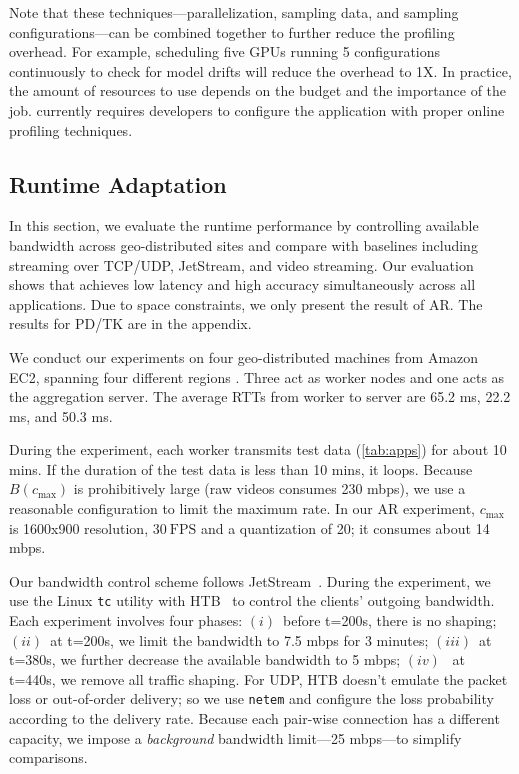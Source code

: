 Note that these techniques---parallelization, sampling data, and sampling
configurations---can be combined together to further reduce the profiling
overhead. For example, scheduling five GPUs running 5 configurations
continuously to check for model drifts will reduce the overhead to 1X\@. In
practice, the amount of resources to use depends on the budget and the
importance of the job. \sysname{} currently requires developers to configure the
application with proper online profiling techniques.


\subsection{Runtime Adaptation}
\label{sec:runtime-adaptation}

In this section, we evaluate the runtime performance by controlling available
bandwidth across geo-distributed sites and compare \sysname{} with baselines
including streaming over TCP/UDP, JetStream, and video streaming. Our evaluation
shows that \sysname{} achieves low latency and high accuracy simultaneously
across all applications. Due to space constraints, we only present the result of
AR. The results for PD/TK are in the appendix.

 We conduct our experiments on four geo-distributed
machines from Amazon EC2, spanning four different regions . Three
act as worker
nodes and one acts as the aggregation server. The average RTTs from worker to
server are 65.2 ms, 22.2 ms, and 50.3 ms.

During the experiment, each worker transmits test data (\autoref{tab:apps}) for
about 10 mins. If the duration of the test data is less than 10 mins, it
loops. Because $B(c_{\max})$ is prohibitively large (raw videos consumes 230
mbps), we use a reasonable configuration to limit the maximum rate. In our AR
experiment, $c_{\max}$ is 1600x900 resolution, \(30~\text{FPS}\) and a
quantization of 20; it consumes about 14 mbps.

Our bandwidth control scheme follows
JetStream~\cite{rabkin2014aggregation}. During the experiment, we use the Linux
\texttt{tc} utility with HTB~\cite{htb, lartc} to control the clients' outgoing
bandwidth. Each experiment involves four phases: $(i)$~before t=200s, there is
no shaping; $(ii)$~at t=200s, we limit the bandwidth to 7.5 mbps for 3 minutes;
$(iii)$~at t=380s, we further decrease the available bandwidth to 5 mbps;
$(iv)$~ at t=440s, we remove all traffic shaping. For UDP, HTB doesn't emulate
the packet loss or out-of-order delivery; so we use \texttt{netem} and configure
the loss probability according to the delivery rate. Because each pair-wise
connection has a different capacity, we impose a \textit{background} bandwidth
limit---25 mbps---to simplify comparisons.

